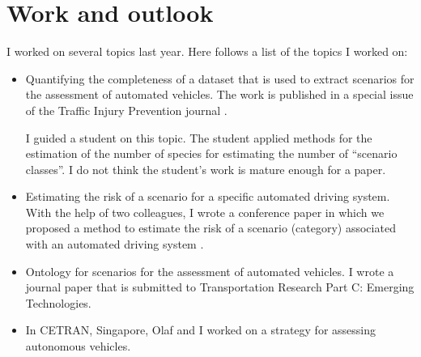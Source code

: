 \documentclass[10pt,final,a4paper,oneside,onecolumn]{article}
\begin{document}
\section{Work and outlook}
\label{sec:work}

I worked on several topics last year. Here follows a list of the topics I worked on:
\begin{itemize}
	\item Quantifying the completeness of a dataset that is used to extract scenarios for the assessment of automated vehicles. The work is published in a special issue of the Traffic Injury Prevention journal \cite{degelder2019completeness}.
	
	I guided a student on this topic. The student applied methods for the estimation of the number of species \cite{chao1992estimating, chao1993stopping} for estimating the number of ``scenario classes''. I do not think the student's work is mature enough for a paper.
	
	\item Estimating the risk of a scenario for a specific automated driving system. With the help of two colleagues, I wrote a conference paper in which we proposed a method to estimate the risk of a scenario (category) associated with an automated driving system \cite{degelder2019risk}.
	
	\item Ontology for scenarios for the assessment of automated vehicles. I wrote a journal paper that is submitted to Transportation Research Part C: Emerging Technologies.
	
	\item In CETRAN, Singapore, Olaf and I worked on a strategy for assessing autonomous vehicles.
\end{itemize}
\end{document}
